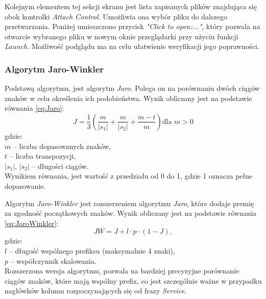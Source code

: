 Kolejnym elementem tej sekcji ekranu jest lista zapisanych plików znajdująca się obok kontrolki \emph{Attach Control}. Umożliwia ona wybór pliku do dalszego przetwarzania. Poniżej umieszczono przycisk \emph{"Click to open:..."}, który pozwala na otwarcie wybranego pliku w nowym oknie przeglądarki przy użyciu funkcji \emph{Launch}. Możliwość podglądu ma na celu ułatwienie weryfikacji jego poprawności.

\subsubsection*{Algorytm Jaro-Winkler}
Podstawą algorytmu, jest algorytm \emph{Jaro}. Polega on na porównaniu dwóch ciągów znaków w celu określenia ich podobieństwa. Wynik obliczany jest na podstawie równania \ref{eq:Jaro}:
\begin{equation}
    \label{eq:Jaro}
    J = \frac{1}{3} \left( \frac{m}{|s_1|} + \frac{m}{|s_2|} + \frac{m - t}{m} \right) \mbox{dla } m>0
\end{equation}
\noindent gdzie:\\
$m$ – liczba dopasowanych znaków,\\    $t$ – liczba transpozycji,\\    $|s_1|$, $|s_2|$ – długości ciągów.\\

\noindent Wynikiem równania, jest wartość z przedziału od 0 do 1, gdzie 1 oznacza pełne dopasowanie. 

Algorytm \emph{Jaro-Winkler} jest rozszerzeniem algorytmu \emph{Jaro}, które dodaje premię za zgodność początkowych znaków. Wynik obliczany jest na podstawie równania \ref{eq:JaroWinkler}:
\begin{equation}
    \label{eq:JaroWinkler}
    JW = J + l \cdot p \cdot (1 - J),
\end{equation}
gdzie:\\
$l$ – długość wspólnego prefiksu (maksymalnie 4 znaki),\\ $p$ – współczynnik skalowania.\\

\noindent Rozszerzona wersja algorytmu, pozwala na bardziej precyzyjne porównanie ciągów znaków, które mają wspólny prefix, co jest szczególnie ważne w przypadku nagłówków kolumn rozpoczynających się od frazy \emph{Service}.


\vspace{1cm}



